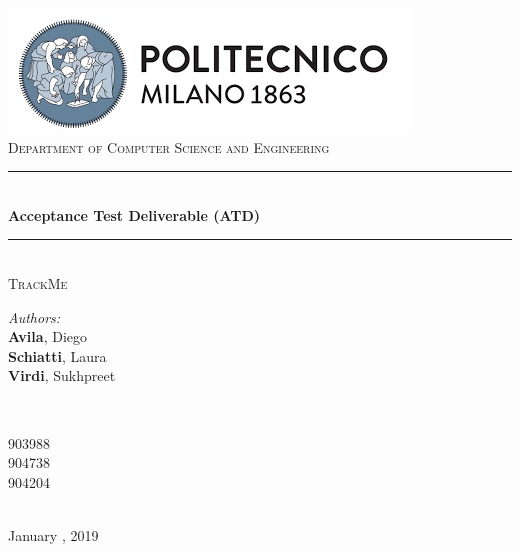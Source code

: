 \documentclass[a4paper, hidelinks, 12pt]{report}
\begin{document}
	\begin{titlepage}
		\centering
		\vspace*{0.7 cm}
		\includegraphics[scale = 0.85]{../Assets/PolimiLogo.png}\\[1.6 cm]
		\textsc{\large Department of Computer Science and Engineering}\\[1.8 cm]

		\rule{\linewidth}{0.2 mm} \\[0.4 cm]
		{ \huge \bfseries Acceptance Test Deliverable (ATD)}\\
		\rule{\linewidth}{0.2 mm} \\[1.5 cm]

		\textsc{\Large TrackMe}\\[3 cm]

		\begin{minipage}{0.4\textwidth}
			\begin{flushleft} \large
				\emph{Authors:}\\
				\textbf{Avila}, Diego \\
				\textbf{Schiatti}, Laura \\
				\textbf{Virdi}, Sukhpreet
			\end{flushleft}
		\end{minipage}~
		\begin{minipage}{0.4\textwidth}
			\begin{flushright} \large
				903988 \\
				904738 \\
				904204
			\end{flushright}
		\end{minipage}\\[2 cm]


		{\large January  , 2019}\\[2 cm]

		\vfill
	\end{titlepage}

	\tableofcontents
	\newpage
\listoffigures
	\listoftables
	\clearpage
	\setcounter{page}{1}
\end{document}
